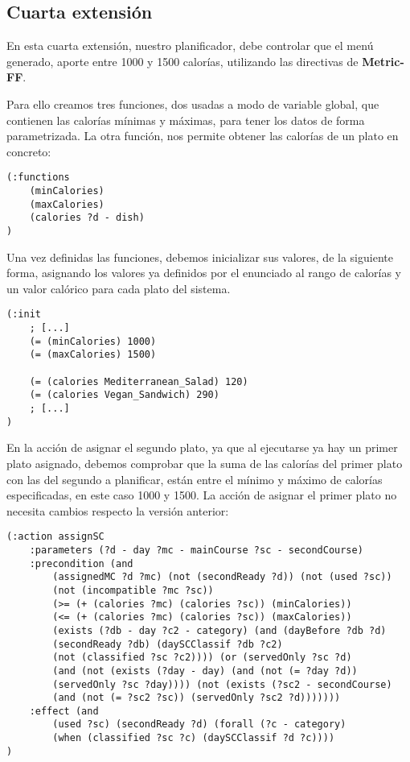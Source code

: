 \documentclass{article}
\begin{document}
\subsection{Cuarta extensión}
En esta cuarta extensión, nuestro planificador, debe controlar que el menú generado, aporte entre 1000 y 1500 calorías, utilizando las directivas de \textbf{Metric-FF}.
\par
Para ello creamos tres funciones, dos usadas a modo de variable global, que contienen las calorías mínimas y máximas, para tener los datos de forma parametrizada. La otra función, nos permite obtener las calorías de un plato en concreto:
\begin{lstlisting}[language=pddl]
(:functions
    (minCalories)
    (maxCalories)
    (calories ?d - dish)
)
\end{lstlisting}
Una vez definidas las funciones, debemos inicializar sus valores, de la siguiente forma, asignando los valores ya definidos por el enunciado al rango de calorías y un valor calórico para cada plato del sistema.
\begin{lstlisting}[language=pddl]
(:init
    ; [...]
    (= (minCalories) 1000)
    (= (maxCalories) 1500)

    (= (calories Mediterranean_Salad) 120)
    (= (calories Vegan_Sandwich) 290)
    ; [...]
)
\end{lstlisting}
En la acción de asignar el segundo plato, ya que al ejecutarse ya hay un primer plato asignado, debemos comprobar que la suma de las calorías del primer plato con las del segundo a planificar, están entre el mínimo y máximo de calorías especificadas, en este caso 1000 y 1500. La acción de asignar el primer plato no necesita cambios respecto la versión anterior:
\begin{lstlisting}[language=pddl]
(:action assignSC
    :parameters (?d - day ?mc - mainCourse ?sc - secondCourse)
    :precondition (and
        (assignedMC ?d ?mc) (not (secondReady ?d)) (not (used ?sc))
        (not (incompatible ?mc ?sc))
        (>= (+ (calories ?mc) (calories ?sc)) (minCalories))
        (<= (+ (calories ?mc) (calories ?sc)) (maxCalories))
        (exists (?db - day ?c2 - category) (and (dayBefore ?db ?d)
        (secondReady ?db) (daySCClassif ?db ?c2)
        (not (classified ?sc ?c2)))) (or (servedOnly ?sc ?d)
        (and (not (exists (?day - day) (and (not (= ?day ?d))
        (servedOnly ?sc ?day)))) (not (exists (?sc2 - secondCourse)
        (and (not (= ?sc2 ?sc)) (servedOnly ?sc2 ?d)))))))
    :effect (and
        (used ?sc) (secondReady ?d) (forall (?c - category)
        (when (classified ?sc ?c) (daySCClassif ?d ?c))))
)
\end{lstlisting}
\end{document}
